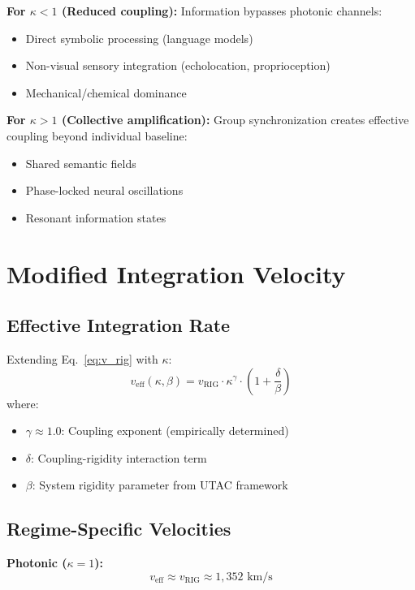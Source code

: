 \documentclass[11pt,a4paper]{article}
\begin{document}
\textbf{For $\kappa < 1$ (Reduced coupling):}
Information bypasses photonic channels:
\begin{itemize}
  \item Direct symbolic processing (language models)
  \item Non-visual sensory integration (echolocation, proprioception)
  \item Mechanical/chemical dominance
\end{itemize}

\textbf{For $\kappa > 1$ (Collective amplification):}
Group synchronization creates effective coupling beyond individual baseline:
\begin{itemize}
  \item Shared semantic fields
  \item Phase-locked neural oscillations
  \item Resonant information states
\end{itemize}

\section{Modified Integration Velocity}

\subsection{Effective Integration Rate}

Extending Eq.~\eqref{eq:v_rig} with $\kappa$:
\begin{equation}
v_{\text{eff}}(\kappa, \beta) = v_{\text{RIG}} \cdot \kappa^{\gamma} \cdot \left(1 + \frac{\delta}{\beta}\right)
\label{eq:v_eff}
\end{equation}
where:
\begin{itemize}
  \item $\gamma \approx 1.0$: Coupling exponent (empirically determined)
  \item $\delta$: Coupling-rigidity interaction term
  \item $\beta$: System rigidity parameter from UTAC framework \cite{Roemer2025_UTAC}
\end{itemize}

\subsection{Regime-Specific Velocities}

\textbf{Photonic ($\kappa=1$):}
\begin{equation}
v_{\text{eff}} \approx v_{\text{RIG}} \approx 1{,}352 \text{ km/s}
\end{equation}
\end{document}
